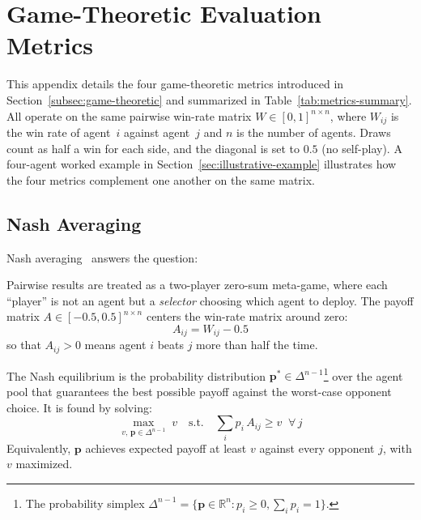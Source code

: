 \chapter{Game-Theoretic Evaluation Metrics}
\label{app:game-theory}

This appendix details the four game-theoretic metrics introduced in Section~\ref{subsec:game-theoretic} and summarized in Table~\ref{tab:metrics-summary}. All operate on the same pairwise win-rate matrix $W \in [0,1]^{n{\times}n}$, where $W_{ij}$ is the win rate of agent~$i$ against agent~$j$ and $n$ is the number of agents. Draws count as half a win for each side, and the diagonal is set to $0.5$ (no self-play). A four-agent worked example in Section~\ref{sec:illustrative-example} illustrates how the four metrics complement one another on the same matrix.

\section{Nash Averaging}
\label{app:nash-impl}

Nash averaging~\cite{balduzziReevaluatingEvaluation2018} answers the question: 

\medskip

Pairwise results are treated as a two-player zero-sum meta-game, where each ``player'' is not an agent but a \emph{selector} choosing which agent to deploy. The payoff matrix $A \in [-0.5,0.5]^{n{\times}n}$ centers the win-rate matrix around zero:
\begin{equation}
    A_{ij} = W_{ij} - 0.5
\end{equation}
so that $A_{ij} > 0$ means agent $i$ beats $j$ more than half the time.

The Nash equilibrium is the probability distribution $\mathbf{p}^* \in \Delta^{n-1}$\footnote{The probability simplex $\Delta^{n-1} = \{\mathbf{p} \in \mathbb{R}^n : p_i \geq 0, \sum_i p_i = 1\}$.} over the agent pool that guarantees the best possible payoff against the worst-case opponent choice. It is found by solving:
\begin{equation}
    \max_{v,\, \mathbf{p} \in \Delta^{n-1}} \; v
    \quad \text{s.t.} \quad
    \sum_{i} p_i \, A_{ij} \geq v \;\; \forall\, j
\end{equation}
Equivalently, $\mathbf{p}$ achieves expected payoff at least $v$ against every opponent $j$, with $v$ maximized.

